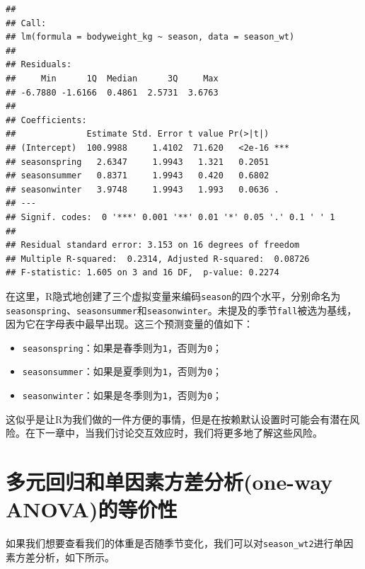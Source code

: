 \documentclass[
]{book}
\providecommand{\tightlist}{%
  \setlength{\itemsep}{0pt}\setlength{\parskip}{0pt}}
\begin{document}
\begin{verbatim}
## 
## Call:
## lm(formula = bodyweight_kg ~ season, data = season_wt)
## 
## Residuals:
##     Min      1Q  Median      3Q     Max 
## -6.7880 -1.6166  0.4861  2.5731  3.6763 
## 
## Coefficients:
##              Estimate Std. Error t value Pr(>|t|)    
## (Intercept)  100.9988     1.4102  71.620   <2e-16 ***
## seasonspring   2.6347     1.9943   1.321   0.2051    
## seasonsummer   0.8371     1.9943   0.420   0.6802    
## seasonwinter   3.9748     1.9943   1.993   0.0636 .  
## ---
## Signif. codes:  0 '***' 0.001 '**' 0.01 '*' 0.05 '.' 0.1 ' ' 1
## 
## Residual standard error: 3.153 on 16 degrees of freedom
## Multiple R-squared:  0.2314, Adjusted R-squared:  0.08726 
## F-statistic: 1.605 on 3 and 16 DF,  p-value: 0.2274
\end{verbatim}

在这里，R隐式地创建了三个虚拟变量来编码\texttt{season}的四个水平，分别命名为\texttt{seasonspring}、\texttt{seasonsummer}和\texttt{seasonwinter}。未提及的季节\texttt{fall}被选为基线，因为它在字母表中最早出现。这三个预测变量的值如下：

\begin{itemize}
\tightlist
\item
  \texttt{seasonspring}：如果是春季则为\texttt{1}，否则为\texttt{0}；
\item
  \texttt{seasonsummer}：如果是夏季则为\texttt{1}，否则为\texttt{0}；
\item
  \texttt{seasonwinter}：如果是冬季则为\texttt{1}，否则为\texttt{0}；
\end{itemize}

这似乎是让R为我们做的一件方便的事情，但是在按赖默认设置时可能会有潜在风险。在下一章中，当我们讨论交互效应时，我们将更多地了解这些风险。

\hypertarget{ux591aux5143ux56deux5f52ux548cux5355ux56e0ux7d20ux65b9ux5deeux5206ux6790one-way-anovaux7684ux7b49ux4ef7ux6027}{%
\section{多元回归和单因素方差分析(one-way ANOVA)的等价性}\label{ux591aux5143ux56deux5f52ux548cux5355ux56e0ux7d20ux65b9ux5deeux5206ux6790one-way-anovaux7684ux7b49ux4ef7ux6027}}

如果我们想要查看我们的体重是否随季节变化，我们可以对\texttt{season\_wt2}进行单因素方差分析，如下所示。
\end{document}
